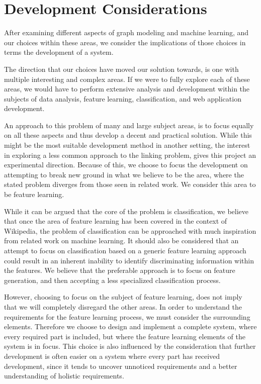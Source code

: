 \section{Development Considerations}
After examining different aspects of graph modeling and machine learning, and our choices within these areas, we consider the implications of those choices in terms the development of a system.

The direction that our choices have moved our solution towards, is one with multiple interesting and complex areas. If we were to fully explore each of these areas, we would have to perform extensive analysis and development within the subjects of data analysis, feature learning, classification, and web application development.

An approach to this problem of many and large subject areas, is to focus equally on all these aspects and thus develop a decent and practical solution. While this might be the most suitable development method in another setting, the interest in exploring a less common approach to the linking problem, gives this project an experimental direction. Because of this, we choose to focus the development on attempting to break new ground in what we believe to be the area, where the stated problem diverges from those seen in related work. We consider this area to be feature learning.

While it can be argued that the core of the problem is classification, we believe that once the area of feature learning has been covered in the context of Wikipedia, the problem of classification can be approached with much inspiration from related work on machine learning. It should also be considered that an attempt to focus on classification based on a generic feature learning approach could result in an inherent inability to identify discriminating information within the features. We believe that the preferable approach is to focus on feature generation, and then accepting a less specialized classification process.

However, choosing to focus on the subject of feature learning, does not imply that we will completely disregard the other areas. In order to understand the requirements for the feature learning process, we must consider the surrounding elements. Therefore we choose to design and implement a complete system, where every required part is included, but where the feature learning elements of the system is in focus. This choice is also influenced by the consideration that further development is often easier on a system where every part has received development, since it tends to uncover unnoticed requirements and a better understanding of holistic requirements.
